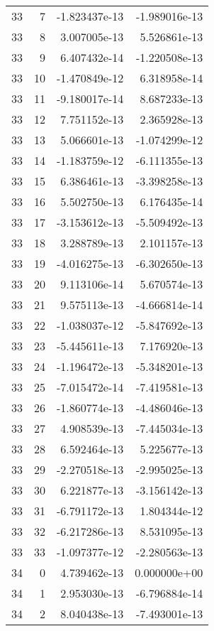 \begin{tabular}{rrrr}
  33 &    7 & -1.823437e-13 & -1.989016e-13 \\
  33 &    8 &  3.007005e-13 &  5.526861e-13 \\
  33 &    9 &  6.407432e-14 & -1.220508e-13 \\
  33 &   10 & -1.470849e-12 &  6.318958e-14 \\
  33 &   11 & -9.180017e-14 &  8.687233e-13 \\
  33 &   12 &  7.751152e-13 &  2.365928e-13 \\
  33 &   13 &  5.066601e-13 & -1.074299e-12 \\
  33 &   14 & -1.183759e-12 & -6.111355e-13 \\
  33 &   15 &  6.386461e-13 & -3.398258e-13 \\
  33 &   16 &  5.502750e-13 &  6.176435e-14 \\
  33 &   17 & -3.153612e-13 & -5.509492e-13 \\
  33 &   18 &  3.288789e-13 &  2.101157e-13 \\
  33 &   19 & -4.016275e-13 & -6.302650e-13 \\
  33 &   20 &  9.113106e-14 &  5.670574e-13 \\
  33 &   21 &  9.575113e-13 & -4.666814e-14 \\
  33 &   22 & -1.038037e-12 & -5.847692e-13 \\
  33 &   23 & -5.445611e-13 &  7.176920e-13 \\
  33 &   24 & -1.196472e-13 & -5.348201e-13 \\
  33 &   25 & -7.015472e-14 & -7.419581e-13 \\
  33 &   26 & -1.860774e-13 & -4.486046e-13 \\
  33 &   27 &  4.908539e-13 & -7.445034e-13 \\
  33 &   28 &  6.592464e-13 &  5.225677e-13 \\
  33 &   29 & -2.270518e-13 & -2.995025e-13 \\
  33 &   30 &  6.221877e-13 & -3.156142e-13 \\
  33 &   31 & -6.791172e-13 &  1.804344e-12 \\
  33 &   32 & -6.217286e-13 &  8.531095e-13 \\
  33 &   33 & -1.097377e-12 & -2.280563e-13 \\
  34 &    0 &  4.739462e-13 &  0.000000e+00 \\
  34 &    1 &  2.953030e-13 & -6.796884e-14 \\
  34 &    2 &  8.040438e-13 & -7.493001e-13 \\

\end{tabular}
